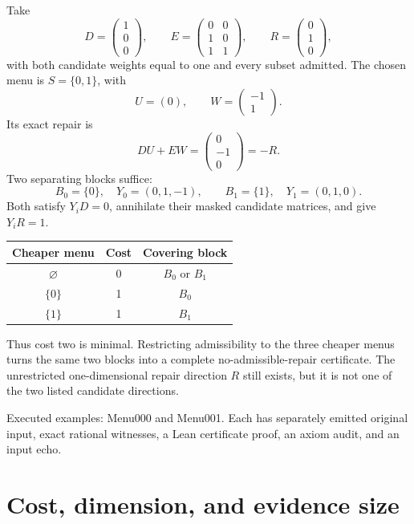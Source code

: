 \documentclass[11pt,letterpaper,oneside,openany]{book}
\theoremstyle{quiet}
\newcommand{\sourcescope}[1]{\par\begingroup\small\color{Slate}#1\par\endgroup}
\begin{document}
Take
\[
 D=\begin{pmatrix}1\\0\\0\end{pmatrix},\qquad
 E=\begin{pmatrix}0&0\\1&0\\1&1\end{pmatrix},\qquad
 R=\begin{pmatrix}0\\1\\0\end{pmatrix},
\]
with both candidate weights equal to one and every subset admitted. The chosen menu is $S=\{0,1\}$, with
\[
 U=(0),\qquad W=\begin{pmatrix}-1\\1\end{pmatrix}.
\]
Its exact repair is
\[
 DU+EW=\begin{pmatrix}0\\-1\\0\end{pmatrix}=-R.
\]
Two separating blocks suffice:
\[
 B_0=\{0\},\quad Y_0=(0,1,-1),\qquad
 B_1=\{1\},\quad Y_1=(0,1,0).
\]
Both satisfy $Y_iD=0$, annihilate their masked candidate matrices, and give $Y_iR=1$.

\begin{center}
\begin{tabular}{@{}ccc@{}}\toprule
Cheaper menu & Cost & Covering block\\\midrule
$\varnothing$ & 0 & $B_0$ or $B_1$\\
$\{0\}$ & 1 & $B_0$\\
$\{1\}$ & 1 & $B_1$\\\bottomrule
\end{tabular}
\end{center}
Thus cost two is minimal. Restricting admissibility to the three cheaper menus turns the same two blocks into a complete no-admissible-repair certificate. The unrestricted one-dimensional repair direction $R$ still exists, but it is not one of the two listed candidate directions.

\sourcescope{Executed examples: Menu000 and Menu001. Each has separately emitted original input, exact rational witnesses, a Lean certificate proof, an axiom audit, and an input echo.}

\section{Cost, dimension, and evidence size}
\end{document}
